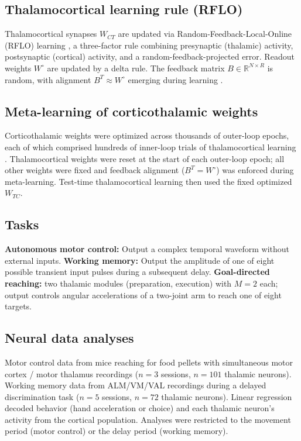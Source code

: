 \documentclass[11pt]{article}
\begin{document}
\subsection{Thalamocortical learning rule (RFLO)}
Thalamocortical synapses $W_{CT}$ are updated via Random-Feedback-Local-Online (RFLO) learning \cite{murray2019local}, a three-factor rule combining presynaptic (thalamic) activity, postsynaptic (cortical) activity, and a random-feedback-projected error. Readout weights $W^\circ$ are updated by a delta rule. The feedback matrix $B \in \mathbb{R}^{N\times R}$ is random, with alignment $B^T \approx W^\circ$ emerging during learning \cite{lillicrap2016random}.

\subsection{Meta-learning of corticothalamic weights}
Corticothalamic weights were optimized across thousands of outer-loop epochs, each of which comprised hundreds of inner-loop trials of thalamocortical learning \cite{wang2021metalearning,hospedales2022metalearning,wang2018prefrontal,jiang2021metalearning,tyulmankov2022metalearning}. Thalamocortical weights were reset at the start of each outer-loop epoch; all other weights were fixed and feedback alignment ($B^T = W^\circ$) was enforced during meta-learning. Test-time thalamocortical learning then used the fixed optimized $W_{TC}$.

\subsection{Tasks}
\textbf{Autonomous motor control:} Output a complex temporal waveform without external inputs. \textbf{Working memory:} Output the amplitude of one of eight possible transient input pulses during a subsequent delay. \textbf{Goal-directed reaching:} two thalamic modules (preparation, execution) with $M=2$ each; output controls angular accelerations of a two-joint arm to reach one of eight targets.

\subsection{Neural data analyses}
Motor control data from mice reaching for food pellets with simultaneous motor cortex / motor thalamus recordings \cite{sauerbrei2020cortical} ($n=3$ sessions, $n=101$ thalamic neurons). Working memory data from ALM/VM/VAL recordings during a delayed discrimination task \cite{guo2017maintenance} ($n=5$ sessions, $n=72$ thalamic neurons). Linear regression decoded behavior (hand acceleration or choice) and each thalamic neuron's activity from the cortical population. Analyses were restricted to the movement period (motor control) or the delay period (working memory).
\end{document}
